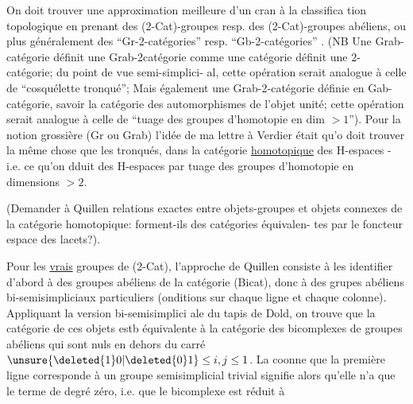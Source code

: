 
On doit trouver une approximation meilleure d'un cran à la classifica
tion topologique en prenant des (2-Cat)-groupes resp. des (2-Cat)-groupes
abéliens, ou plus généralement des ``Gr-2-catégories'' resp.
``Gb-2-catégories'' . (NB Une Grab-catégorie définit une Grab-2catégorie
comme une catégorie définit une 2-catégorie; du point de vue semi-simplici-
al, cette opération serait analogue à celle de ``cosquélette tronqué'';
Mais également une Grab-2-catégorie définie en Gab-catégorie, savoir la
catégorie des automorphismes de l'objet unité; cette  opération serait
analogue à celle de ``tuage des groupes d'homotopie en dim $>1$''). Pour la
notion grossière (Gr ou Grab) l'idée de ma lettre à Verdier était qu'o
doit trouver la même chose que les tronqués, dans la catégorie \uline{homotopique}
des H-espaces - i.e. ce qu'on dduit des H-espaces par tuage des groupes
d'homotopie en dimensions $>2$.

(Demander à Quillen relations exactes entre o\deleted{\unsure{-}}bjets-groupes et objets
 connexes de la catégorie homotopique: forment-ils des catégories équivalen-
tes par le foncteur espace des lacets?).

Pour les \uline{vrais} groupes de (2-Cat), l'approche de Quillen consiste à
les identifier d'abord à des groupes abéliens de la catégorie (Bicat),
donc à des grupes abéliens bi-semisimpliciaux particuliers (onditions
sur chaque ligne et chaque colonne). Appliquant la version bi-semisimplici
ale du tapis de Dold, on trouve que  la catégorie de ces objets
estb équivalente à la catégorie des  bicomplexes de groupes abéliens
qui sont nuls en dehors du carré $\unsure{\deleted{1}0|\deleted{0}1}\leq i,j\leq1$.  La coonne
que la première ligne corresponde à un  groupe semisimplicial
trivial signifie alors qu'elle n'a que le terme de degré zéro, i.e. que
le bicomplexe est réduit à

